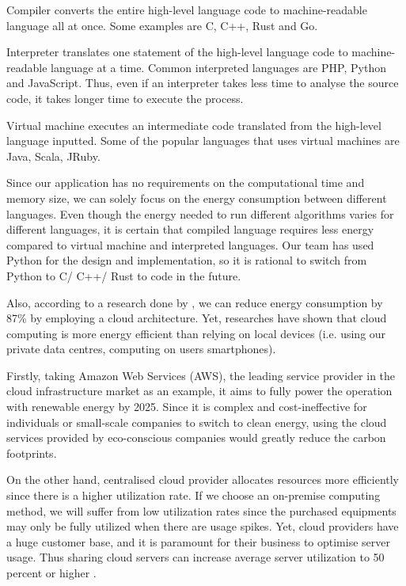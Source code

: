 \begin{description}
    \item Compiler converts the entire high-level language code to machine-readable language all at once. Some examples are C, C++, Rust and Go. 
    \item Interpreter translates one statement of the high-level language code to machine-readable language at a time. Common interpreted languages are PHP, Python and JavaScript.
    Thus, even if an interpreter takes less time to analyse the source code, it takes longer time to execute the process.
    \item Virtual machine executes an intermediate code translated from the high-level language inputted. Some of the popular languages that uses virtual machines are Java, Scala, JRuby.
\end{description}

Since our application has no requirements on the computational time and memory size, we can solely focus on the energy consumption between 
different languages. Even though the energy needed to run different algorithms varies for different languages, it is certain that
compiled language requires less energy compared to virtual machine and interpreted languages. Our team has used Python for the design and implementation, so 
it is rational to switch from Python to C/ C++/ Rust to code in the future.

Also, according to a research done by \cite{cloudpercent}, we can reduce energy consumption by 87\% by employing a cloud architecture.
Yet, researches have shown that cloud computing is more energy efficient than relying on local devices (i.e. using our private data centres, computing on
users\textsc{} smartphones).

Firstly, taking Amazon Web Services (AWS), the leading service provider in the cloud infrastructure market as an example, it aims to fully power the operation with renewable
energy by 2025. Since it is complex and cost-ineffective for individuals or small-scale companies to switch to clean energy, using the cloud services provided
by eco-conscious companies would greatly reduce the carbon footprints.

On the other hand, centralised cloud provider allocates resources more efficiently since there is a higher utilization rate. If we choose an on-premise computing method, we will suffer
from low utilization rates since the purchased equipments may only be fully utilized when there are usage spikes. Yet, cloud providers have a huge customer base, and it is paramount for 
their business to optimise server usage. Thus sharing cloud servers can increase average server utilization to 50 percent or higher .

